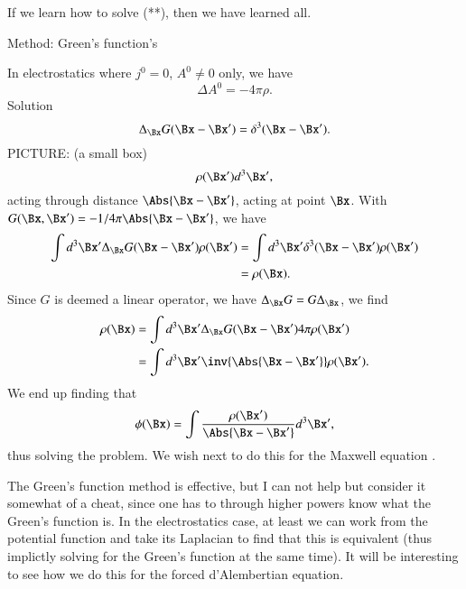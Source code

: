 If we learn how to solve (**), then we have learned all.

Method: Green's function's

In electrostatics where \(j^0 = 0\), \(A^0 \ne 0\) only, we have
%
\begin{equation}\label{eqn:relativisticElectrodynamicsL17b:330}
\Delta A^0 = -4 \pi \rho.
\end{equation}
Solution
%
\begin{equation}\label{eqn:relativisticElectrodynamicsL17b:350}
\Delta_{\Bx} G(\Bx - \Bx') = \delta^3( \Bx - \Bx').
\end{equation}
%
PICTURE: (a small box)
%
\begin{equation}\label{eqn:relativisticElectrodynamicsL17b:370}
\rho(\Bx') d^3 \Bx',
\end{equation}
acting through distance \(\Abs{\Bx - \Bx'}\), acting at point \(\Bx\).  With \(G(\Bx, \Bx') = -1/4 \pi\Abs{\Bx - \Bx'}\), we have
%
\begin{equation}\label{eqn:relativisticElectrodynamicsL17b:410}
\begin{aligned}
\int d^3 \Bx' \Delta_{\Bx} G(\Bx - \Bx') \rho(\Bx')
&= \int d^3 \Bx' \delta^3( \Bx - \Bx') \rho(\Bx') \\
&= \rho(\Bx).
\end{aligned}
\end{equation}
Since \(G\) is deemed a linear operator, we have \(\Delta_\Bx G = G \Delta_\Bx\), we find
%
\begin{equation}\label{eqn:relativisticElectrodynamicsL17b:430}
\begin{aligned}
\rho(\Bx)
&=
\int d^3 \Bx' \Delta_{\Bx} G(\Bx - \Bx') 4 \pi \rho(\Bx') \\
&=
\int d^3 \Bx' \inv{\Abs{\Bx - \Bx'}} \rho(\Bx').
\end{aligned}
\end{equation}
We end up finding that
%
\begin{equation}\label{eqn:relativisticElectrodynamicsL17b:390}
\phi(\Bx) = \int \frac{\rho(\Bx')}{\Abs{\Bx - \Bx'}} d^3 \Bx',
\end{equation}
thus solving the problem.  We wish next to do this for the Maxwell equation .

The Green's function method is effective, but I can not help but consider it somewhat of a cheat, since one has to through higher powers know what the Green's function is.  In the electrostatics case, at least we can work from the potential function and take its Laplacian to find that this is equivalent (thus implictly solving for the Green's function at the same time).  It will be interesting to see how we do this for the forced d'Alembertian equation.
